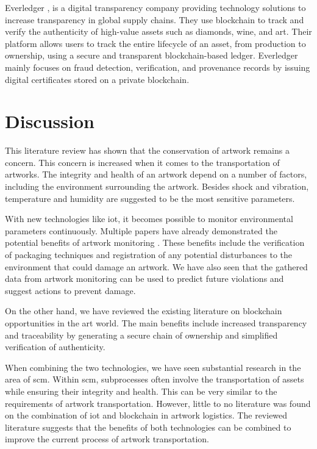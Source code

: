 Everledger \cite{everledger}, is a digital transparency company providing technology solutions to increase transparency in global supply chains. They use blockchain to track and verify the authenticity of high-value assets such as diamonds, wine, and art. Their platform allows users to track the entire lifecycle of an asset, from production to ownership, using a secure and transparent blockchain-based ledger. Everledger mainly focuses on fraud detection, verification, and provenance records by issuing digital certificates stored on a private blockchain.

\section{Discussion}
\label{sec:related_work_discussion}
This literature review has shown that the conservation of artwork remains a concern. This concern is increased when it comes to the transportation of artworks. The integrity and health of an artwork depend on a number of factors, including the environment surrounding the artwork. Besides shock and vibration, temperature and humidity are suggested to be the most sensitive parameters.

With new technologies like \gls{iot}, it becomes possible to monitor environmental parameters continuously. Multiple papers have already demonstrated the potential benefits of artwork monitoring \cite{pactart} \cite{riskmonitoring} \cite{woodenartworkmonitoring} \cite{shockvibrationtransit}. These benefits include the verification of packaging techniques and registration of any potential disturbances to the environment that could damage an artwork. We have also seen that the gathered data from artwork monitoring can be used to predict future violations and suggest actions to prevent damage.

On the other hand, we have reviewed the existing literature on blockchain opportunities in the art world. The main benefits include increased transparency and traceability by generating a secure chain of ownership and simplified verification of authenticity.

When combining the two technologies, we have seen substantial research in the area of \gls{scm}. Within \gls{scm}, subprocesses often involve the transportation of assets while ensuring their integrity and health. This can be very similar to the requirements of artwork transportation. However, little to no literature was found on the combination of \gls{iot} and blockchain in artwork logistics. The reviewed literature suggests that the benefits of both technologies can be combined to improve the current process of artwork transportation.
